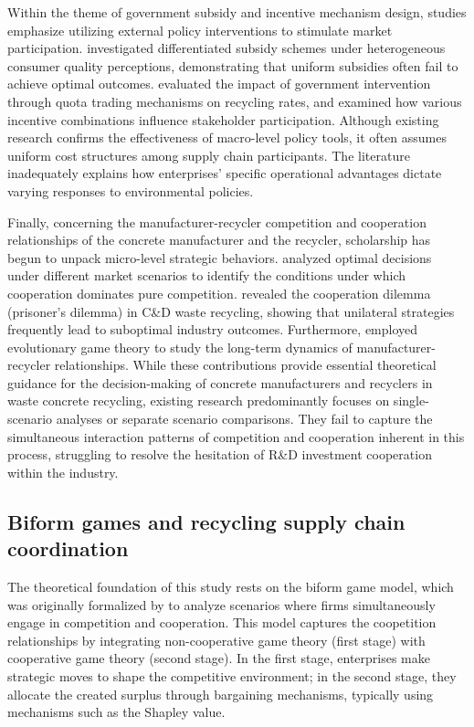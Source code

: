 \documentclass[authoryear,preprint,review,times,10pt]{elsarticle}
\begin{document}
Within the theme of government subsidy and incentive mechanism design, studies emphasize utilizing external policy interventions to stimulate market participation. \cite{yuan2023Differentiated} investigated differentiated subsidy schemes under heterogeneous consumer quality perceptions, demonstrating that uniform subsidies often fail to achieve optimal outcomes. \cite{su2024Stakeholder} evaluated the impact of government intervention through quota trading mechanisms on recycling rates, and \cite{zheng2024Optimal} examined how various incentive combinations influence stakeholder participation. 
Although existing research confirms the effectiveness of macro-level policy tools, it often assumes uniform cost structures among supply chain participants. The literature inadequately explains how enterprises' specific operational advantages dictate varying responses to environmental policies.

Finally, concerning the manufacturer-recycler competition and cooperation relationships of the concrete manufacturer and the recycler, scholarship has begun to unpack micro-level strategic behaviors. \cite{he2020Investigation} analyzed optimal decisions under different market scenarios to identify the conditions under which cooperation dominates pure competition. \cite{lin2025Cooperation} revealed the cooperation dilemma (prisoner's dilemma) in C\&D waste recycling, showing that unilateral strategies frequently lead to suboptimal industry outcomes. Furthermore, \cite{li2025Mechanism} employed evolutionary game theory to study the long-term dynamics of manufacturer-recycler relationships. While these contributions provide essential theoretical guidance for the decision-making of concrete manufacturers and recyclers in waste concrete recycling, existing research predominantly focuses on single-scenario analyses or separate scenario comparisons. They fail to capture the simultaneous interaction patterns of competition and cooperation inherent in this process, struggling to resolve the hesitation of R\&D investment cooperation within the industry.

\subsection{Biform games and recycling supply chain coordination}
The theoretical foundation of this study rests on the biform game model, which was originally formalized by \cite{brandenburger2007Biform} to analyze scenarios where firms simultaneously engage in competition and cooperation. This model captures the coopetition relationships by integrating non-cooperative game theory (first stage) with cooperative game theory (second stage). In the first stage, enterprises make strategic moves to shape the competitive environment; in the second stage, they allocate the created surplus through bargaining mechanisms, typically using mechanisms such as the Shapley value.
\end{document}
